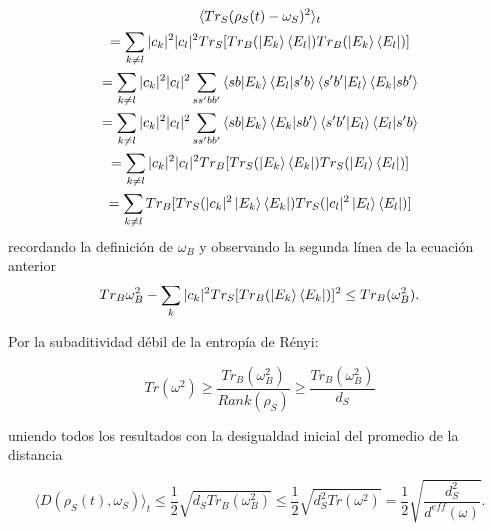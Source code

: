 \begin{multline}
\langle Tr_{S}(\rho_{S}(t)-\omega_{S})^{2} \rangle_{t} \\
	= \sum_{k \neq l} |c_{k}|^{2} |c_{l}|^{2} Tr_{S} [Tr_{B}(\ket{E_{k}} \bra{E_{l}}) Tr_{B}(\ket{E_{k}} \bra{E_{l}})] \\
	=\sum_{k \neq l} |c_{k}|^{2} |c_{l}|^{2} \sum_{ss' bb'} \bra{sb}\ket{E_{k}} \bra{E_{l}}\ket{s'b} \bra{s'b'}\ket{E_{l}} \bra{E_{k}}\ket{sb'} \\
	=\sum_{k \neq l} |c_{k}|^{2} |c_{l}|^{2} \sum_{ss' bb'} \bra{sb}\ket{E_{k}} \bra{E_{k}}\ket{sb'} \bra{s'b'}\ket{E_{l}} \bra{E_{l}}\ket{s'b}\\
	=\sum_{k \neq l} |c_{k}|^{2} |c_{l}|^{2} Tr_{B} [Tr_{S}(\ket{E_{k}} \bra{E_{k}}) Tr_{S}(\ket{E_{l}} \bra{E_{l}})] \\
	=\sum_{k \neq l}  Tr_{B} [Tr_{S}(|c_{k}|^{2}\ket{E_{k}} \bra{E_{k}}) Tr_{S}( |c_{l}|^{2} \ket{E_{l}} \bra{E_{l}})] 
\end{multline}
recordando la definición de $\omega_{B}$ y observando la segunda línea de la ecuación anterior
\begin{equation}
Tr_{B} \omega_{B}^{2} -\sum_{k} |c_{k}|^{2} Tr_{S}[ Tr_{B}( \ket{E_{k}} \bra{E_{k}})]^{2} \leq  Tr_{B}( \omega_{B}^{2}).
\end{equation}

Por la subaditividad débil de la entropía de Rényi:

\begin{equation}
Tr(\omega^{2}) \geq  \frac{Tr_{B}(\omega_{B}^{2})}{Rank(\rho_{S})} \geq \frac{Tr_{B}(\omega_{B}^{2})}{d_{S}}
\end{equation}

uniendo todos los resultados con la desigualdad inicial del promedio de la distancia

\begin{equation}
\langle D(\rho_{S}(t) ,\omega_{S}) \rangle_{t} \le  \frac{1}{2} \sqrt{d_{S} Tr_{B}(\omega_{B}^{2})} \le \frac{1}{2}\sqrt{d_{S}^{2}Tr(\omega^{2})}=\frac{1}{2}\sqrt{\frac{d_{S}^{2}}{d^{eff}(\omega)}}.
\end{equation}

